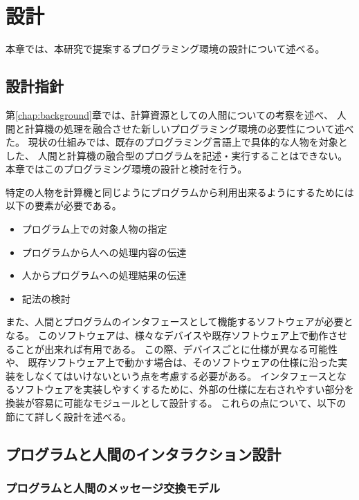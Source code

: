 \chapter{設計}\label{chap:design}

本章では、本研究で提案するプログラミング環境の設計について述べる。

\section{設計指針}\label{ux8a2dux8a08ux6307ux91dd}

第\ref{chap:background}章では、計算資源としての人間についての考察を述べ、
人間と計算機の処理を融合させた新しいプログラミング環境の必要性について述べた。
現状の仕組みでは、既存のプログラミング言語上で具体的な人物を対象とした、
人間と計算機の融合型のプログラムを記述・実行することはできない。
本章ではこのプログラミング環境の設計と検討を行う。

特定の人物を計算機と同じようにプログラムから利用出来るようにするためには以下の要素が必要である。

\begin{itemize}
\itemsep1pt\parskip0pt
\item
  プログラム上での対象人物の指定
\item
  プログラムから人への処理内容の伝達
\item
  人からプログラムへの処理結果の伝達
\item
  記法の検討
\end{itemize}

また、人間とプログラムのインタフェースとして機能するソフトウェアが必要となる。
このソフトウェアは、様々なデバイスや既存ソフトウェア上で動作させることが出来れば有用である。
この際、デバイスごとに仕様が異なる可能性や、
既存ソフトウェア上で動かす場合は、そのソフトウェアの仕様に沿った実装をしなくてはいけないという点を考慮する必要がある。
インタフェースとなるソフトウェアを実装しやすくするために、外部の仕様に左右されやすい部分を
換装が容易に可能なモジュールとして設計する。
これらの点について、以下の節にて詳しく設計を述べる。

\section{プログラムと人間のインタラクション設計}\label{sec:program-human-interaction-design}

\subsection{プログラムと人間のメッセージ交換モデル}\label{ux30d7ux30edux30b0ux30e9ux30e0ux3068ux4ebaux9593ux306eux30e1ux30c3ux30bbux30fcux30b8ux4ea4ux63dbux30e2ux30c7ux30eb}

